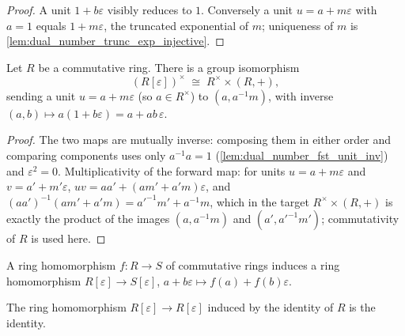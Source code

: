\begin{proof}\leanok
  A unit \(1 + b\varepsilon\) visibly reduces to \(1\). Conversely a
  unit \(u = a + m\varepsilon\) with \(a = 1\) equals
  \(1 + m\varepsilon\), the truncated exponential of \(m\);
  uniqueness of \(m\) is
  \cref{lem:dual_number_trunc_exp_injective}.
\end{proof}

\begin{theorem}\leanok
  \label{thm:dual_number_units_split}
  Let \(R\) be a commutative ring. There is a group isomorphism
  \[
    (R[\varepsilon])^{\times} \;\cong\; R^{\times} \times (R, +),
  \]
  sending a unit \(u = a + m\varepsilon\) (so \(a \in R^{\times}\)) to
  \((a, a^{-1}m)\), with inverse
  \((a, b) \mapsto a(1 + b\varepsilon) = a + ab\,\varepsilon\).
\end{theorem}

\begin{proof}\leanok
  The two maps are mutually inverse: composing them in either order and
  comparing components uses only
  \(a^{-1}a = 1\) (\cref{lem:dual_number_fst_unit_inv}) and
  \(\varepsilon^2 = 0\). Multiplicativity of the forward map: for
  units \(u = a + m\varepsilon\) and \(v = a' + m'\varepsilon\),
  \(uv = aa' + (am' + a'm)\varepsilon\), and
  \((aa')^{-1}(am' + a'm) = a'^{-1}m' + a^{-1}m\), which in the target
  \(R^{\times} \times (R,+)\) is exactly the product of the images
  \((a, a^{-1}m)\) and \((a', a'^{-1}m')\); commutativity of \(R\) is
  used here.
\end{proof}

\begin{definition}\leanok
  \label{def:dual_number_map}
  A ring homomorphism \(f : R \to S\) of commutative rings induces a
  ring homomorphism
  \(R[\varepsilon] \to S[\varepsilon]\),
  \(a + b\varepsilon \mapsto f(a) + f(b)\varepsilon\).
\end{definition}

\begin{lemma}\leanok
  \label{lem:dual_number_map_id}
  The ring homomorphism \(R[\varepsilon] \to R[\varepsilon]\) induced
  by the identity of \(R\) is the identity.
\end{lemma}

